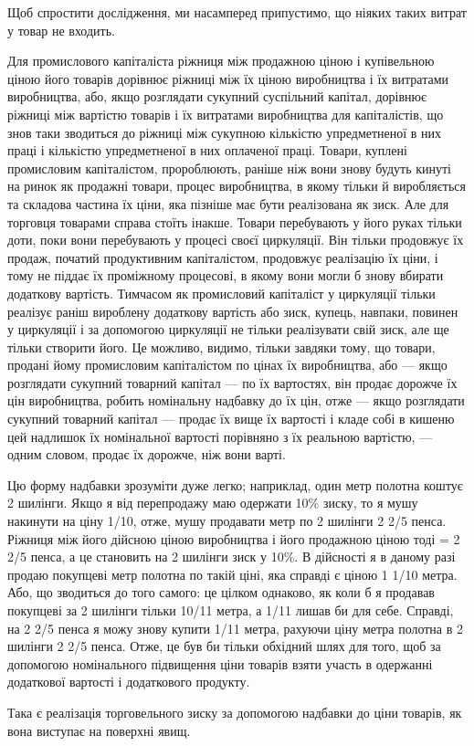 Щоб спростити дослідження, ми насамперед припустимо, що
ніяких таких витрат у товар не входить.

Для промислового капіталіста ріжниця між продажною ціною
і купівельною ціною його товарів дорівнює ріжниці між їх ціною
виробництва і їх витратами виробництва, або, якщо розглядати
сукупний суспільний капітал, дорівнює ріжниці між
вартістю товарів і їх витратами виробництва для капіталістів,
що знов таки зводиться до ріжниці між сукупною кількістю
упредметненої в них праці і кількістю упредметненої в них
оплаченої праці. Товари, куплені промисловим капіталістом, пророблюють,
раніше ніж вони знову будуть кинуті на ринок як
продажні товари, процес виробництва, в якому тільки й виробляється
та складова частина їх ціни, яка пізніше має бути
реалізована як зиск. Але для торговця товарами справа стоїть
інакше. Товари перебувають у його руках тільки доти, поки
вони перебувають у процесі своєї циркуляції. Він тільки продовжує
їх продаж, початий продуктивним капіталістом, продовжує
реалізацію їх ціни, і тому не піддає їх проміжному процесові,
в якому вони могли б знову вбирати додаткову вартість. Тимчасом
як промисловий капіталіст у циркуляції тільки реалізує
раніш вироблену додаткову вартість або зиск, купець, навпаки,
повинен у циркуляції і за допомогою циркуляції не тільки реалізувати
свій зиск, але ще тільки створити його. Це можливо,
видимо, тільки завдяки тому, що товари, продані йому промисловим
капіталістом по цінах їх виробництва, або — якщо розглядати
сукупний товарний капітал — по їх вартостях, він продає
дорожче їх цін виробництва, робить номінальну надбавку до
їх цін, отже — якщо розглядати сукупний товарний капітал —
продає їх вище їх вартості і кладе собі в кишеню цей надлишок
їх номінальної вартості порівняно з їх реальною вартістю, — одним
словом, продає їх дорожче, ніж вони варті.

Цю форму надбавки зрозуміти дуже легко; наприклад, один
метр полотна коштує 2 шилінги. Якщо я від перепродажу маю
одержати 10\% зиску, то я мушу накинути на ціну 1/10, отже,
мушу продавати метр по 2 шилінги 2 2/5 пенса. Ріжниця між його
дійсною ціною виробництва і його продажною ціною тоді = 2 2/5
пенса, а це становить на 2 шилінги зиск у 10\%. В дійсності
я в даному разі продаю покупцеві метр полотна по такій ціні,
яка справді є ціною 1 1/10 метра. Або, що зводиться до того
самого: це цілком однаково, як коли б я продавав покупцеві за
2 шилінги тільки 10/11 метра, а 1/11 лишав би для себе. Справді, на
2 2/5 пенса я можу знову купити 1/11 метра, рахуючи ціну метра
полотна в 2 шилінги 2 2/5 пенса. Отже, це був би тільки обхідний
шлях для того, щоб за допомогою номінального підвищення
ціни товарів взяти участь в одержанні додаткової вартості і додаткового
продукту.

Така є реалізація торговельного зиску за допомогою надбавки
до ціни товарів, як вона виступає на поверхні явищ.
